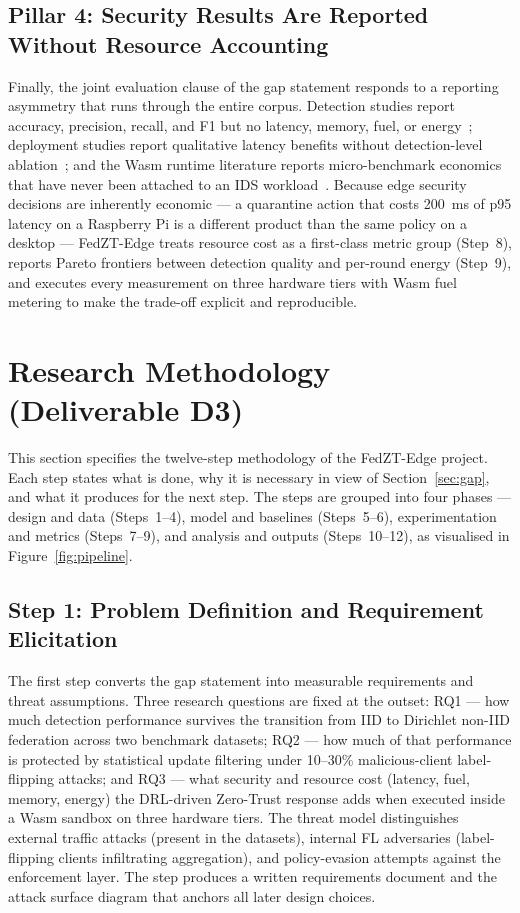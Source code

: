 \documentclass[11pt,a4paper]{article}
\newcommand{\bigsection}[1]{\Needspace*{0.22\textheight}\section{#1}}
\begin{document}
\subsection{Pillar 4: Security Results Are Reported Without Resource
Accounting}\label{sec:gap4}

Finally, the joint evaluation clause of the gap statement responds to a
reporting asymmetry that runs through the entire corpus. Detection
studies report accuracy, precision, recall, and F1 but no latency,
memory, fuel, or energy~\cite{albogami2025,karunamurthy2025}; deployment
studies report qualitative latency benefits without detection-level
ablation~\cite{berguiga2025}; and the Wasm runtime literature reports
micro-benchmark economics that have never been attached to an IDS
workload~\cite{zhang2025}. Because edge security decisions are inherently
economic --- a quarantine action that costs 200~ms of p95 latency on a
Raspberry Pi is a different product than the same policy on a desktop ---
FedZT-Edge treats resource cost as a first-class metric group
(Step~8), reports Pareto frontiers between detection quality and
per-round energy (Step~9), and executes every measurement on three
hardware tiers with Wasm fuel metering to make the trade-off explicit and
reproducible.

\bigsection{Research Methodology (Deliverable D3)}\label{sec:method}

This section specifies the twelve-step methodology of the FedZT-Edge
project. Each step states what is done, why it is necessary in view of
Section~\ref{sec:gap}, and what it produces for the next step. The steps
are grouped into four phases --- design and data (Steps~1--4), model and
baselines (Steps~5--6), experimentation and metrics (Steps~7--9), and
analysis and outputs (Steps~10--12), as visualised in
Figure~\ref{fig:pipeline}.

\subsection{Step 1: Problem Definition and Requirement Elicitation}
\label{sec:step1}

The first step converts the gap statement into measurable requirements and
threat assumptions. Three research questions are fixed at the outset:
RQ1 --- how much detection performance survives the transition from IID to
Dirichlet non-IID federation across two benchmark datasets; RQ2 --- how
much of that performance is protected by statistical update filtering
under 10--30\% malicious-client label-flipping attacks; and RQ3 --- what
security and resource cost (latency, fuel, memory, energy) the DRL-driven
Zero-Trust response adds when executed inside a Wasm sandbox on three
hardware tiers. The threat model distinguishes external traffic attacks
(present in the datasets), internal FL adversaries (label-flipping clients
infiltrating aggregation), and policy-evasion attempts against the
enforcement layer. The step produces a written requirements document and
the attack surface diagram that anchors all later design choices.
\end{document}
